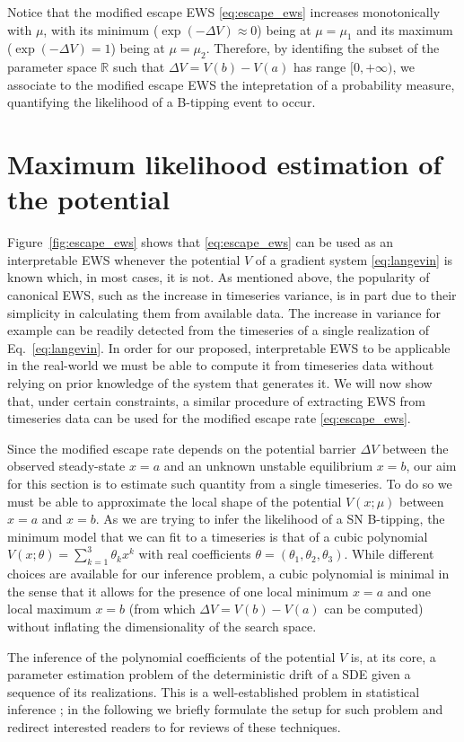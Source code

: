 \documentclass[a4paper,fleqn]{cas-sc}
\newcommand{\fref}[1]{Figure~\ref{#1}}
\begin{document}
Notice that the modified escape EWS \eqref{eq:escape_ews} increases monotonically with $\mu$, with its minimum ($\exp(-\Delta V)\approx0$) being at $\mu=\mu_1$ and its maximum ($\exp(-\Delta V)=1$) being at $\mu=\mu_2$.
Therefore, by identifing the subset of the parameter space $\mathbb{R}$ such that $\Delta V = V(b) - V(a)$ has range $[0,+\infty)$, we associate to the modified escape EWS the intepretation of a probability measure, quantifying the likelihood of a B-tipping event to occur.
%
\section{Maximum likelihood estimation of the potential}\label{sec:mle}
\fref{fig:escape_ews} shows that \eqref{eq:escape_ews} can be used as an interpretable EWS whenever the potential $V$ of a gradient system \eqref{eq:langevin} is known which, in most cases, it is not.
As mentioned above, the popularity of canonical EWS, such as the increase in timeseries variance, is in part due to their simplicity in calculating them from available data.
The increase in variance for example can be readily detected from the timeseries of a single realization of Eq.~\eqref{eq:langevin}.
In order for our proposed, interpretable EWS to be applicable in the real-world we must be able to compute it from timeseries data without relying on prior knowledge of the system that generates it.
We will now show that, under certain constraints, a similar procedure of extracting EWS from timeseries data can be used for the modified escape rate \eqref{eq:escape_ews}.

Since the modified escape rate depends on the potential barrier $\Delta V$ between the observed steady-state $x=a$ and an unknown unstable equilibrium $x=b$, our aim for this section is to estimate such quantity from a single timeseries. 
To do so we must be able to approximate the local shape of the potential $V(x;\mu)$ between $x=a$ and $x=b$.
As we are trying to infer the likelihood of a SN B-tipping, the minimum model that we can fit to a timeseries is that of a cubic polynomial $V(x;\theta) = \sum_{k=1}^{3}\theta_{k}x^{k}$ with real coefficients $\theta=(\theta_{1},\theta_{2},\theta_{3})$.
While different choices are available for our inference problem, a cubic polynomial is minimal in the sense that it allows for the presence of one local minimum $x=a$ and one local maximum $x=b$ (from which $\Delta V = V(b) - V(a)$ can be computed) without inflating the dimensionality of the search space.

The inference of the polynomial coefficients of the potential $V$ is, at its core, a parameter estimation problem of the deterministic drift of a SDE given a sequence of its realizations.
This is a well-established problem in statistical inference \cite[Ch. 11, p. 234]{Sarkka2019}; in the following we briefly formulate the setup for such problem and redirect interested readers to \cite{Nielsen2000, Sorensen2004, Craigmile2022} for reviews of these techniques.
%
\end{document}

